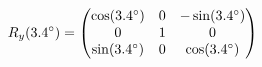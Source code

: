 \documentclass[preview]{standalone}
\begin{document}
\begin{align*}
\special{dvisvgm:raw <g id='unique000'>}R_y(3.4^\circ) = \begin{pmatrix} \cos(3.4^\circ) & 0 & -\sin(3.4^\circ) \\ 0 & 1 & 0 \\ \sin(3.4^\circ) & 0 & \cos(3.4^\circ) \end{pmatrix}\special{dvisvgm:raw </g>}
\end{align*}
\end{document}
